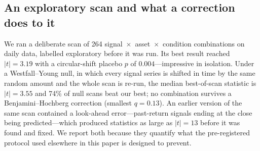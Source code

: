 \documentclass[12pt,a4paper]{article}
\begin{document}
\subsection{An exploratory scan and what a correction does to it}
 We ran a deliberate scan of 264
signal~$\times$~asset~$\times$~condition combinations on daily data, labelled exploratory before it was run. Its best
result reached $|t|=3.19$ with a circular-shift placebo $p$ of $0.004$---impressive in isolation. Under a
Westfall--Young null, in which every signal series is shifted in time by the same random amount and the whole scan is
re-run, the median best-of-scan statistic is $|t|=3.55$ and 74\% of null scans beat our best; no combination survives a
Benjamini--Hochberg correction (smallest $q=0.13$). An earlier version of the same scan contained a look-ahead
error---past-return signals ending at the close being predicted---which produced statistics as large as $|t|=13$ before
it was found and fixed. We report both because they quantify what the pre-registered protocol used elsewhere in this
paper is designed to prevent.
\end{document}
